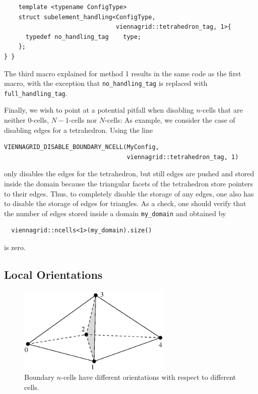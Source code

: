 \begin{itemize}
\begin{lstlisting}
    template <typename ConfigType>
    struct subelement_handling<ConfigType,
                               viennagrid::tetrahedron_tag, 1>{
      typedef no_handling_tag    type;
    };
} }
\end{lstlisting}
The third macro explained for method 1 results in the same code as the first macro, with the exception that \lstinline|no_handling_tag| is replaced with \lstinline|full_handling_tag|.

Finally, we wish to point at a potential pitfall when disabling $n$-cells that are neither $0$-cells, $N-1$-cells nor $N$-cells: As example, we consider the case of disabling edges for a tetrahedron. Using the line
  \begin{lstlisting}
VIENNAGRID_DISABLE_BOUNDARY_NCELL(MyConfig,
                                  viennagrid::tetrahedron_tag, 1)
  \end{lstlisting}
only disables the edges for the tetrahedron, but still edges are pushed and stored inside the domain because the triangular facets of the tetrahedron store pointers to their edges. Thus, to completely disable the storage of any edges, one also has to disable the storage of edges for triangles. As a check, one should verify that the number of edges stored inside a domain \lstinline|my_domain| and obtained by 
 \begin{lstlisting}
  viennagrid::ncells<1>(my_domain).size()
 \end{lstlisting}
is zero.


\subsection{Local Orientations}
\begin{figure}[tb]
\centering
 \includegraphics[width=0.65\textwidth]{figures/interface-tets.eps}
 \caption{Boundary $n$-cells have different orientations with respect to different cells.}
 \label{fig:orientation-boundary-ncells}
\end{figure}


\end{itemize}
